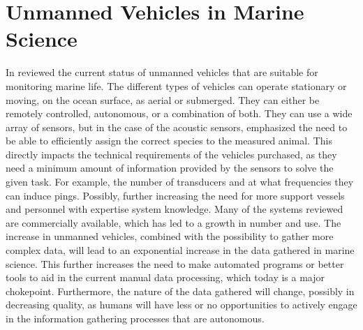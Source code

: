 


\section{Unmanned Vehicles in Marine Science} \label{Unmanned Vehicles in Marine Science}
        In \citeyear{VERFUSS201917} \citeauthor{VERFUSS201917}\cite{VERFUSS201917} reviewed the current status of unmanned vehicles that are suitable for monitoring marine life. The different types of vehicles can operate stationary or moving, on the ocean surface, as aerial or submerged.  They can either be remotely controlled, autonomous, or a combination of both. They can use a wide array of sensors, but in the case of the acoustic sensors, \citeauthor{VERFUSS201917} emphasized the need to be able to efficiently assign the correct species to the measured animal. This directly impacts the technical requirements of the vehicles purchased, as they need a minimum amount of information provided by the sensors to solve the given task. For example, the number of transducers and at what frequencies they can induce pings. Possibly, further increasing the need for more support vessels and personnel with expertise system knowledge. Many of the systems reviewed are commercially available, which has led to a growth in number and use.  The increase in unmanned vehicles, combined with the possibility to gather more complex data, will lead to an exponential increase in the data gathered in marine science\cite{malde2020machine}. This further increases the need to make automated programs or better tools to aid in the current manual data processing, which today is a major chokepoint. Furthermore,  the nature of the data gathered will change, possibly in decreasing quality, as humans will have less or no opportunities to actively engage in the information gathering processes that are autonomous.
        
